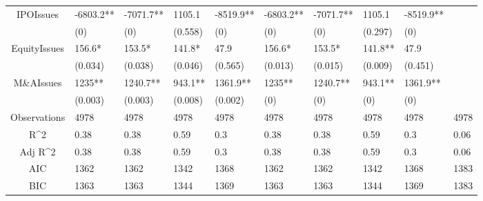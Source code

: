 \documentclass{article}
\begin{document}
\begin{table}[H]
\begin{tabular}{|clllllllll|}
  IPOIssues & -6803.2** & -7071.7** & 1105.1 & -8519.9** & -6803.2** & -7071.7** & 1105.1 & -8519.9** &  \\ 
   & (0) & (0) & (0.558) & (0) & (0) & (0) & (0.297) & (0) &  \\ 
  EquityIssues & 156.6* & 153.5* & 141.8* & 47.9 & 156.6* & 153.5* & 141.8** & 47.9 &  \\ 
   & (0.034) & (0.038) & (0.046) & (0.565) & (0.013) & (0.015) & (0.009) & (0.451) &  \\ 
  M\&AIssues & 1235** & 1240.7** & 943.1** & 1361.9** & 1235** & 1240.7** & 943.1** & 1361.9** &  \\ 
   & (0.003) & (0.003) & (0.008) & (0.002) & (0) & (0) & (0) & (0) &  \\ 
  \hline 
 Observations & 4978 & 4978 & 4978 & 4978 & 4978 & 4978 & 4978 & 4978 & 4978 \\ 
  R^2 & 0.38 & 0.38 & 0.59 & 0.3 & 0.38 & 0.38 & 0.59 & 0.3 & 0.06 \\ 
  Adj R^2 & 0.38 & 0.38 & 0.59 & 0.3 & 0.38 & 0.38 & 0.59 & 0.3 & 0.06 \\ 
  AIC & 1362 & 1362 & 1342 & 1368 & 1362 & 1362 & 1342 & 1368 & 1383 \\ 
  BIC & 1363 & 1363 & 1344 & 1369 & 1363 & 1363 & 1344 & 1369 & 1383 \\ 
   \hline
\end{tabular}
 
\end{table}
\end{document}
